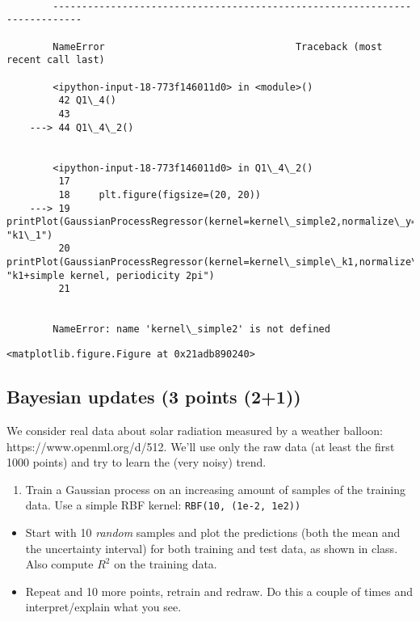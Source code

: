 \documentclass[11pt]{article}
\providecommand{\tightlist}{%
      \setlength{\itemsep}{0pt}\setlength{\parskip}{0pt}}
\begin{document}
    \begin{Verbatim}[commandchars=\\\{\}]

        ---------------------------------------------------------------------------

        NameError                                 Traceback (most recent call last)

        <ipython-input-18-773f146011d0> in <module>()
         42 Q1\_4()
         43 
    ---> 44 Q1\_4\_2()
    

        <ipython-input-18-773f146011d0> in Q1\_4\_2()
         17 
         18     plt.figure(figsize=(20, 20))
    ---> 19     printPlot(GaussianProcessRegressor(kernel=kernel\_simple2,normalize\_y=True,alpha=0.1), "k1\_1")
         20     printPlot(GaussianProcessRegressor(kernel=kernel\_simple\_k1,normalize\_y=True,alpha=0.1), "k1+simple kernel, periodicity 2pi")
         21 
    

        NameError: name 'kernel\_simple2' is not defined

    \end{Verbatim}

    
    \begin{verbatim}
<matplotlib.figure.Figure at 0x21adb890240>
    \end{verbatim}

    
    \subsection{Bayesian updates (3 points
(2+1))}\label{bayesian-updates-3-points-21}

We consider real data about solar radiation measured by a weather
balloon: https://www.openml.org/d/512. We'll use only the raw data (at
least the first 1000 points) and try to learn the (very noisy) trend.

    \begin{enumerate}
\def\labelenumi{\arabic{enumi}.}
\tightlist
\item
  Train a Gaussian process on an increasing amount of samples of the
  training data. Use a simple RBF kernel:
  \texttt{RBF(10,\ (1e-2,\ 1e2))}
\end{enumerate}

\begin{itemize}
\tightlist
\item
  Start with 10 \emph{random} samples and plot the predictions (both the
  mean and the uncertainty interval) for both training and test data, as
  shown in class. Also compute \(R^2\) on the training data.
\item
  Repeat and 10 more points, retrain and redraw. Do this a couple of
  times and interpret/explain what you see.
\end{itemize}
\end{document}
